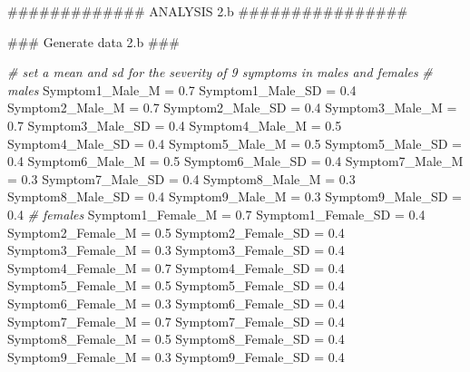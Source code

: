 \documentclass[]{article}
\newenvironment{Shaded}{\begin{snugshade}}{\end{snugshade}}
\newcommand{\FloatTok}[1]{\textcolor[rgb]{0.00,0.00,0.81}{#1}}
\newcommand{\StringTok}[1]{\textcolor[rgb]{0.31,0.60,0.02}{#1}}
\newcommand{\CommentTok}[1]{\textcolor[rgb]{0.56,0.35,0.01}{\textit{#1}}}
\newcommand{\AlertTok}[1]{\textcolor[rgb]{0.94,0.16,0.16}{#1}}
\newcommand{\NormalTok}[1]{#1}
\begin{document}
\begin{Shaded}
\begin{Highlighting}[]
\NormalTok{############# ANALYSIS 2.b ################}

\NormalTok{### Generate data 2.b }\AlertTok{###}

\CommentTok{# set a mean and sd for the severity of 9 symptoms in males and females}
\CommentTok{# males}
\NormalTok{Symptom1_Male_M =}\StringTok{ }\FloatTok{0.7}
\NormalTok{Symptom1_Male_SD =}\StringTok{ }\FloatTok{0.4}
\NormalTok{Symptom2_Male_M =}\StringTok{ }\FloatTok{0.7}
\NormalTok{Symptom2_Male_SD =}\StringTok{ }\FloatTok{0.4}
\NormalTok{Symptom3_Male_M =}\StringTok{ }\FloatTok{0.7}
\NormalTok{Symptom3_Male_SD =}\StringTok{ }\FloatTok{0.4}
\NormalTok{Symptom4_Male_M =}\StringTok{ }\FloatTok{0.5}
\NormalTok{Symptom4_Male_SD =}\StringTok{ }\FloatTok{0.4}
\NormalTok{Symptom5_Male_M =}\StringTok{ }\FloatTok{0.5}
\NormalTok{Symptom5_Male_SD =}\StringTok{ }\FloatTok{0.4}
\NormalTok{Symptom6_Male_M =}\StringTok{ }\FloatTok{0.5}
\NormalTok{Symptom6_Male_SD =}\StringTok{ }\FloatTok{0.4}
\NormalTok{Symptom7_Male_M =}\StringTok{ }\FloatTok{0.3}
\NormalTok{Symptom7_Male_SD =}\StringTok{ }\FloatTok{0.4}
\NormalTok{Symptom8_Male_M =}\StringTok{ }\FloatTok{0.3}
\NormalTok{Symptom8_Male_SD =}\StringTok{ }\FloatTok{0.4}
\NormalTok{Symptom9_Male_M =}\StringTok{ }\FloatTok{0.3}
\NormalTok{Symptom9_Male_SD =}\StringTok{ }\FloatTok{0.4}
\CommentTok{# females}
\NormalTok{Symptom1_Female_M =}\StringTok{ }\FloatTok{0.7}
\NormalTok{Symptom1_Female_SD =}\StringTok{ }\FloatTok{0.4}
\NormalTok{Symptom2_Female_M =}\StringTok{ }\FloatTok{0.5}
\NormalTok{Symptom2_Female_SD =}\StringTok{ }\FloatTok{0.4}
\NormalTok{Symptom3_Female_M =}\StringTok{ }\FloatTok{0.3}
\NormalTok{Symptom3_Female_SD =}\StringTok{ }\FloatTok{0.4}
\NormalTok{Symptom4_Female_M =}\StringTok{ }\FloatTok{0.7}
\NormalTok{Symptom4_Female_SD =}\StringTok{ }\FloatTok{0.4}
\NormalTok{Symptom5_Female_M =}\StringTok{ }\FloatTok{0.5}
\NormalTok{Symptom5_Female_SD =}\StringTok{ }\FloatTok{0.4}
\NormalTok{Symptom6_Female_M =}\StringTok{ }\FloatTok{0.3}
\NormalTok{Symptom6_Female_SD =}\StringTok{ }\FloatTok{0.4}
\NormalTok{Symptom7_Female_M =}\StringTok{ }\FloatTok{0.7}
\NormalTok{Symptom7_Female_SD =}\StringTok{ }\FloatTok{0.4}
\NormalTok{Symptom8_Female_M =}\StringTok{ }\FloatTok{0.5}
\NormalTok{Symptom8_Female_SD =}\StringTok{ }\FloatTok{0.4}
\NormalTok{Symptom9_Female_M =}\StringTok{ }\FloatTok{0.3}
\NormalTok{Symptom9_Female_SD =}\StringTok{ }\FloatTok{0.4}


\end{Highlighting}
\end{Shaded}
\end{document}
